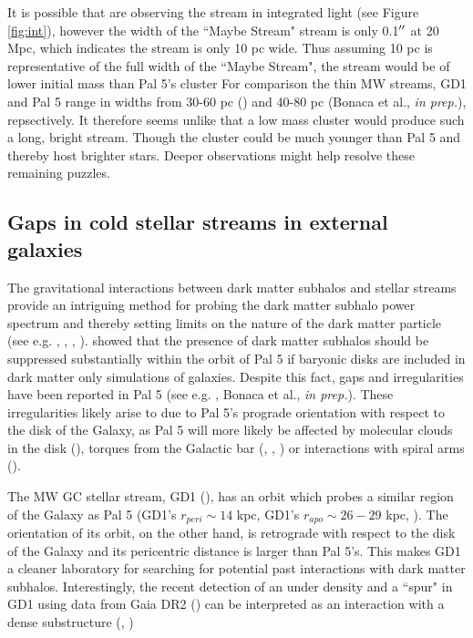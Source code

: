\documentclass[twocolumn]{aastex62}
\begin{document}
It is possible that \citet{abraham18} are observing the stream in integrated light (see Figure \ref{fig:int}), however the width of the ``Maybe Stream" stream is only 0.1$\mbox{$^{\prime\prime}$}$ at 20 Mpc, which indicates the stream is only 10 pc wide. Thus assuming 10 pc is representative of the full width of the ``Maybe Stream", the stream would be of lower initial mass than Pal 5's cluster For comparison the thin MW streams, GD1 and Pal 5 range in widths from 30-60 pc (\citealt{price18}) and 40-80 pc (Bonaca et al., {\it in prep.}), repsectively. It therefore seems unlike that a low mass cluster would produce such a long, bright stream. Though the cluster could be much younger than Pal 5 and thereby host brighter stars. Deeper observations might help resolve these remaining puzzles. 

\subsection{Gaps in cold stellar streams in external galaxies}
The gravitational interactions between dark matter subhalos and stellar streams provide an intriguing method for probing the dark matter subhalo power spectrum and thereby setting limits on the nature of the dark matter particle (see e.g. \citealt{erkal16}, \citealt{bovy17}, \citealt{price18}, \citealt{bonaca19}). \citet{garrison17} showed that the presence of dark matter subhalos should be suppressed substantially within the orbit of Pal 5 if baryonic disks are included in dark matter only simulations of galaxies.  Despite this fact, gaps and irregularities have been reported in Pal 5 (see e.g. \citealt{erkal17}, Bonaca et al., {\it in prep.}). These irregularities likely arise to due to Pal 5's prograde orientation with respect to the disk of the Galaxy, as Pal 5 will more likely be affected by molecular clouds in the disk (\citealt{amorisco16}), torques from the Galactic bar (\citealt{hattori16}, \citealt{erkal17}, \citealt{pearson17}) or interactions with spiral arms (\citealt{banik19}).

The MW GC stellar stream, GD1 (\citealt{grillmair06}), has an orbit which probes a similar region of the Galaxy as Pal 5 (GD1's $r_{peri} \sim 14$ kpc, GD1's $r_{apo} \sim 26-29$ kpc, \citealt{koposov10}). The orientation of its orbit, on the other hand, is retrograde with respect to the disk of the Galaxy and its pericentric distance is larger than Pal 5's. This makes GD1 a cleaner laboratory for searching for potential past interactions with dark matter subhalos. Interestingly, the recent detection of an under density and a ``spur" in GD1 using data from Gaia DR2 (\citealt{gaiadr2}) can be interpreted as an interaction with a dense substructure (\citealt{price18}, \citealt{bonaca19})
\end{document}
